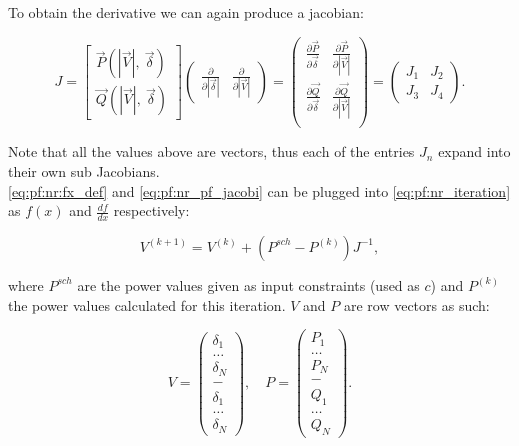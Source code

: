 To obtain the derivative we can again produce a jacobian:

\begin{equation}
    J =  
    \begin{bmatrix}
        \vec{P}(|\vec{V}|, \ \vec{\delta})\\
        \vec{Q}(|\vec{V}|, \ \vec{\delta})
    \end{bmatrix}
    \begin{pmatrix}
        \frac{\partial}{\partial |\vec{\delta}|} & \frac{\partial}{\partial |\vec{V}|}
    \end{pmatrix}
    =
    \begin{pmatrix}
        \frac{\partial \vec{P}}{\partial \vec{\delta}} & \frac{\partial \vec{P} }{\partial |\vec{V}|}\\
        \frac{\partial \vec{Q}}{\partial \vec{\delta}} & \frac{\partial \vec{Q} }{\partial |\vec{V}|}\\
    \end{pmatrix}
    =
    \begin{pmatrix}
        J_1 & J_2\\
        J_3 & J_4
    \end{pmatrix}.
    \label{eq:pf:nr_pf_jacobi}
\end{equation}

Note that all the values above are vectors, thus each of the entries $J_n$ expand into
their own sub Jacobians.\\

\autoref{eq:pf:nr:fx_def} and \autoref{eq:pf:nr_pf_jacobi} 
can be plugged into \autoref{eq:pf:nr_iteration} as $f(x)$ and $\frac{df}{dx}$
respectively:

\begin{equation}
    V^{(k+1)} = V^{(k)} + (P^{sch} - P^{(k)})J^{-1},
    \label{eq:pf:nr:preliminary}
\end{equation}

where $P^{sch}$ are the power values given as input constraints (used
as $c$) and $P^{(k)}$ the power values
calculated for this iteration.
$V$ and $P$ are row vectors as such:

\begin{equation}
    V = 
    \begin{pmatrix}
        \delta_1\\
        \dots\\
        \delta_N\\
        -\\
        \delta_1\\
        \dots\\
        \delta_N
    \end{pmatrix},
    \quad
    P = 
    \begin{pmatrix}
        P_1\\
        \dots\\
        P_N\\
        -\\
        Q_1\\
        \dots\\
        Q_N
    \end{pmatrix}.
\end{equation}

